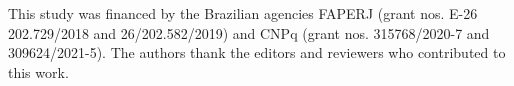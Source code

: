 This study was financed by the Brazilian agencies FAPERJ (grant nos. E-26 202.729/2018 and 26/202.582/2019) and CNPq (grant nos. 315768/2020-7 and 309624/2021-5). The authors thank the editors and reviewers who contributed to this work.